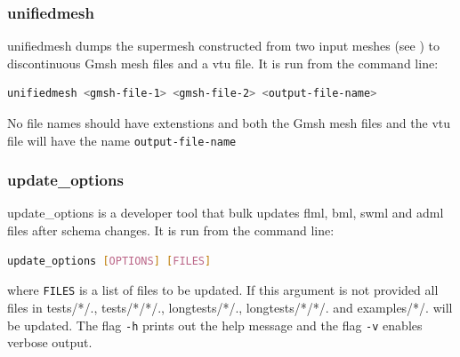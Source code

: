 
%
%


\subsubsection{unifiedmesh}
\label{sec:unifiedmesh}
unifiedmesh dumps the supermesh constructed from two input meshes (see \citet{farrell2009a,farrell2010a}) to discontinuous Gmsh mesh files and a vtu file. It is run from the command line:
\begin{lstlisting}[language = Bash]
unifiedmesh <gmsh-file-1> <gmsh-file-2> <output-file-name>
\end{lstlisting}
No file names should have extenstions and both the Gmsh mesh files and the vtu file will have the name \lstinline[language = Bash]+output-file-name+


\subsubsection{update\_options}
\label{sec:update_options}
update\_options is a developer tool that bulk updates flml, bml, swml and adml files after schema changes. It is run from the command line:
\begin{lstlisting}[language = Bash]
update_options [OPTIONS] [FILES]
\end{lstlisting}
where \lstinline+FILES+ is a list of files to be updated. If this argument is not provided all files in tests/*/., tests/*/*/., longtests/*/., longtests/*/*/. and examples/*/. will be updated.
The flag \lstinline[language = Bash]+-h+ prints out the help message and the flag \lstinline[language = Bash]+-v+ enables verbose output.


